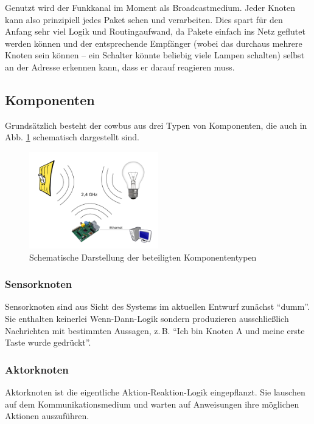 \documentclass{IEEEtran}
\begin{document}
        Genutzt wird der Funkkanal im Moment als Broadcastmedium.
        Jeder Knoten kann also prinzipiell jedes Paket sehen und verarbeiten.
        Dies spart für den Anfang sehr viel Logik und Routingaufwand,
        da Pakete einfach ins Netz geflutet werden können und der entsprechende
        Empfänger (wobei das durchaus mehrere Knoten sein können -- ein Schalter
        könnte beliebig viele Lampen schalten) selbst an der Adresse erkennen
        kann, dass er darauf reagieren muss.

    \subsection{Komponenten}
        Grundsätzlich besteht der cowbus aus drei Typen von Komponenten,
        die auch in Abb. \ref{fig:comp} schematisch dargestellt sind.

        \begin{figure}
            \centering
            \includegraphics[width=0.5\textwidth]{img/system}
            \caption{Schematische Darstellung der beteiligten Komponententypen}
            \label{fig:comp}
        \end{figure}

        \subsubsection{Sensorknoten}\label{Sensorknoten}
            Sensorknoten sind aus Sicht des Systems im aktuellen Entwurf
            zunächst \enquote{dumm}. Sie enthalten keinerlei Wenn-Dann-Logik
            sondern produzieren ausschließlich Nachrichten mit bestimmten
            Aussagen, z.\,B. \enquote{Ich bin Knoten A und meine erste Taste
            wurde gedrückt}.
        \subsubsection{Aktorknoten}\label{Aktorknoten}
            Aktorknoten ist die eigentliche Aktion-Reaktion-Logik eingepflanzt.
            Sie lauschen auf dem Kommunikationsmedium und warten auf Anweisungen
            ihre möglichen Aktionen auszuführen.
\end{document}
